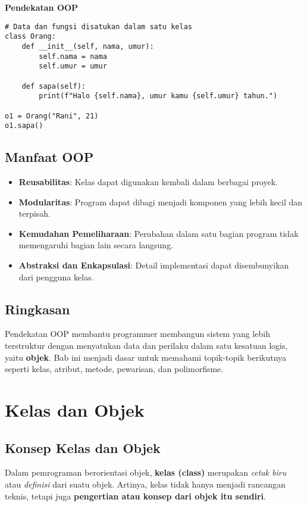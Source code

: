 \noindent\textbf{Pendekatan OOP}
\begin{lstlisting}[style=PythonStyle, caption={Pendekatan Berorientasi Objek}]
# Data dan fungsi disatukan dalam satu kelas
class Orang:
    def __init__(self, nama, umur):
        self.nama = nama
        self.umur = umur

    def sapa(self):
        print(f"Halo {self.nama}, umur kamu {self.umur} tahun.")

o1 = Orang("Rani", 21)
o1.sapa()
\end{lstlisting}

\subsection*{Manfaat OOP}
\begin{itemize}
    \item \textbf{Reusabilitas}: Kelas dapat digunakan kembali dalam berbagai proyek.
    \item \textbf{Modularitas}: Program dapat dibagi menjadi komponen yang lebih kecil dan terpisah.
    \item \textbf{Kemudahan Pemeliharaan}: Perubahan dalam satu bagian program tidak memengaruhi bagian lain secara langsung.
    \item \textbf{Abstraksi dan Enkapsulasi}: Detail implementasi dapat disembunyikan dari pengguna kelas.
\end{itemize}

\subsection*{Ringkasan}
Pendekatan OOP membantu programmer membangun sistem yang lebih terstruktur dengan menyatukan data dan perilaku dalam satu kesatuan logis, yaitu \textbf{objek}. Bab ini menjadi dasar untuk memahami topik-topik berikutnya seperti kelas, atribut, metode, pewarisan, dan polimorfisme.


\section{Kelas dan Objek}

\subsection{Konsep Kelas dan Objek}
Dalam pemrograman berorientasi objek, \textbf{kelas (class)} merupakan \emph{cetak biru} atau \emph{definisi} dari suatu objek.  
Artinya, kelas tidak hanya menjadi rancangan teknis, tetapi juga \textbf{pengertian atau konsep dari objek itu sendiri}.  


